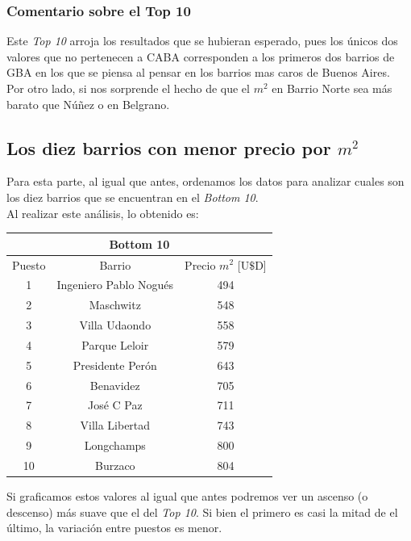 \documentclass[a4paper, 10pt]{article}
\newcommand\tab[1][0.5cm]{\hspace*{#1}}
\begin{document}
			  	\subsubsection{Comentario sobre el Top 10}
				  	Este \emph{Top 10} arroja los resultados que se hubieran esperado, pues los únicos dos valores que no pertenecen
			  	a CABA corresponden a los primeros dos barrios de GBA en los que se piensa al pensar en los barrios mas caros
			  	de Buenos Aires. \\
			  		\tab Por otro lado, si nos sorprende el hecho de que el $m^2$ en Barrio Norte sea más barato que Núñez o en
			  		Belgrano.
			\subsection{Los diez barrios con menor precio por $m^2$}
				Para esta parte, al igual que antes, ordenamos los datos para analizar cuales son los diez barrios que se encuentran
				en el \emph{Bottom 10}. \\
				\tab Al realizar este análisis, lo obtenido es:
				\begin{center}
					\begin{tabular}{ |c|c|c| }
						\hline
						\multicolumn{3}{|c|}{Bottom 10}\\
						\hline
						Puesto & Barrio & Precio $m^2$ [U$\$$D] \\
						\hline
						1 & Ingeniero Pablo Nogués & 494 \\
						2 & Maschwitz & 548 \\
						3 & Villa Udaondo & 558 \\
						4 & Parque Leloir & 579 \\
						5 & Presidente Perón & 643 \\
						6 & Benavidez & 705 \\
						7 & José C Paz & 711 \\
						8 & Villa Libertad & 743 \\
						9 & Longchamps & 800 \\
						10 & Burzaco & 804 \\
						\hline
					\end{tabular}
				\end{center}
				\tab Si graficamos estos valores al igual que antes podremos ver un ascenso (o descenso) más suave que el del
				\emph{Top 10}. Si bien el primero es casi la mitad de el último, la variación entre puestos es menor. \\
\end{document}

